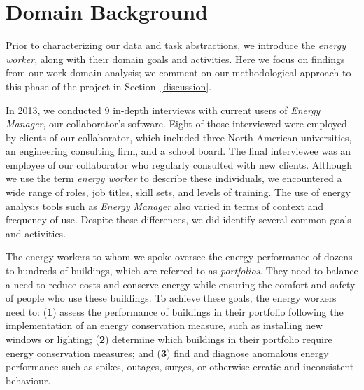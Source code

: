 \documentclass[journal]{vgtc}                %
\newcommand{\bstart}[1]{\vspace{1mm} \noindent{\textbf{#1:}}}
\begin{document}

\section{Domain Background}
\label{domain}


Prior to characterizing our data and task abstractions, we introduce the {\it energy worker}, along with their domain goals and activities.
Here we focus on findings from our work domain analysis; we comment on our methodological approach to this phase of the project in Section~\ref{discussion}. 

In 2013, we conducted 9 in-depth interviews with current users of {\it Energy Manager}, our collaborator's software. 
Eight of those interviewed were employed by clients of our collaborator, which included three North American universities, an engineering consulting firm, and a school board. 
The final interviewee was an employee of our collaborator who regularly consulted with new clients.  
Although we use the term {\it energy worker} to describe these individuals, we encountered a wide range of roles, job titles, skill sets, and levels of training. 
The use of energy analysis tools such as {\it Energy Manager} also varied in terms of context and frequency of use.
Despite these differences, we did identify several common goals and activities.

\bstart{Domain goals and activities} The energy workers to whom we spoke oversee the energy performance of dozens to hundreds of buildings, which are referred to as {\it portfolios}. 
They need to balance a need to reduce costs and conserve energy while ensuring the comfort and safety of people who use these buildings.
To achieve these goals, the energy workers need to: ({\bf 1}) assess the performance of buildings in their portfolio following the implementation of an energy conservation measure, such as installing new windows or lighting; ({\bf 2}) determine which buildings in their portfolio require energy conservation measures; and ({\bf 3}) find and diagnose anomalous energy performance such as spikes, outages, surges, or otherwise erratic and inconsistent behaviour.
\end{document}
